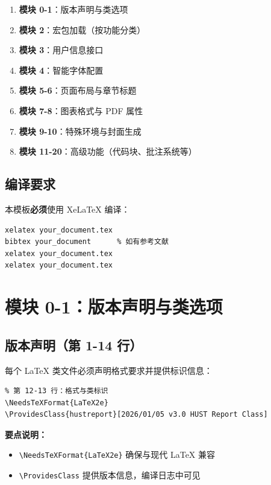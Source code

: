 \documentclass[linux]{hustreport}
\begin{document}
\begin{enumerate}
    \item \textbf{模块 0-1}：版本声明与类选项
    \item \textbf{模块 2}：宏包加载（按功能分类）
    \item \textbf{模块 3}：用户信息接口
    \item \textbf{模块 4}：智能字体配置
    \item \textbf{模块 5-6}：页面布局与章节标题
    \item \textbf{模块 7-8}：图表格式与 PDF 属性
    \item \textbf{模块 9-10}：特殊环境与封面生成
    \item \textbf{模块 11-20}：高级功能（代码块、批注系统等）
\end{enumerate}

\subsection{编译要求}

本模板\textbf{必须}使用 XeLaTeX 编译：

\begin{verbatim}
xelatex your_document.tex
bibtex your_document      % 如有参考文献
xelatex your_document.tex
xelatex your_document.tex
\end{verbatim}

\newpage
\section{模块 0-1：版本声明与类选项}

\subsection{版本声明（第 1-14 行）}

每个 \LaTeX{} 类文件必须声明格式要求并提供标识信息：

\begin{verbatim}
% 第 12-13 行：格式与类标识
\NeedsTeXFormat{LaTeX2e}
\ProvidesClass{hustreport}[2026/01/05 v3.0 HUST Report Class]
\end{verbatim}

\textbf{要点说明：}
\begin{itemize}
    \item \verb|\NeedsTeXFormat{LaTeX2e}| 确保与现代 \LaTeX{} 兼容
    \item \verb|\ProvidesClass| 提供版本信息，编译日志中可见
\end{itemize}
\end{document}
